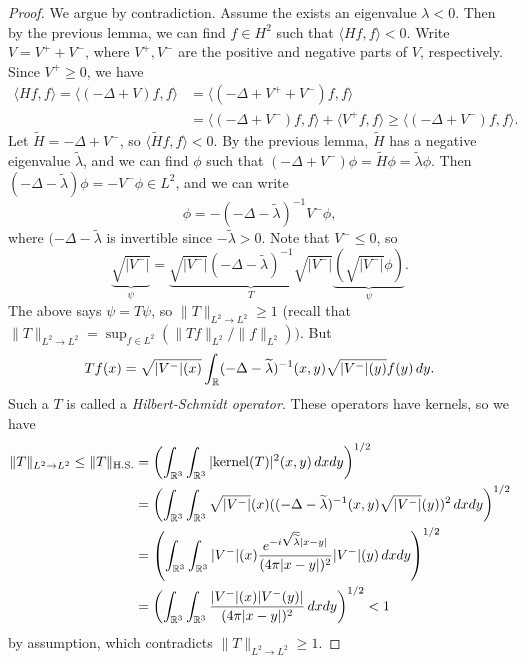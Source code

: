 \begin{proof}
  We argue by contradiction. Assume the exists an
  eigenvalue $\lambda < 0$. Then by the previous lemma,
  we can find $f \in H^2$ such that
  $\langle Hf, f \rangle < 0$. Write
  $V = V^+ + V^-$,
  where $V^+, V^-$ are the positive and negative parts
  of $V$, respectively. Since $V^+ \ge 0$, we have
  \begin{align*}
    \langle Hf, f \rangle
    = \langle (-\Delta + V) f, f \rangle
    &= \langle (-\Delta + V^+ + V^-) f, f \rangle \\
    &= \langle (-\Delta + V^-) f, f \rangle + \langle V^+ f, f \rangle
    \ge \langle (-\Delta + V^-) f, f \rangle.
  \end{align*}
  Let $\widetilde{H} = -\Delta + V^-$, so
  $\langle \widetilde{H} f, f \rangle < 0$.
  By the previous lemma, $\widetilde{H}$ has a
  negative eigenvalue $\widetilde{\lambda}$, and
  we can find $\phi$ such that
  $(-\Delta + V^-) \phi
    = \widetilde{H} \phi = \widetilde{\lambda} \phi$.
    Then $(-\Delta - \widetilde{\lambda}) \phi = -V^- \phi \in L^2$, and we can write
    \[
      \phi = -(-\Delta - \widetilde{\lambda})^{-1} V^- \phi,
    \]
    where $(-\Delta - \widetilde{\lambda}$ is invertible
    since $-\widetilde{\lambda} > 0$. Note that
    $V^- \le 0$, so
    \[
      \underbrace{\sqrt{|V^-|}}_{\psi} = \underbrace{\sqrt{|V^-|} (-\Delta - \widetilde{\lambda})^{-1}\sqrt{|V^-|}}_T \underbrace{(\sqrt{|V^-|}\phi)}_{\psi}.
    \]
    The above says $\psi = T \psi$, so
    $\|T\|_{L^2 \to L^2} \ge 1$ (recall that
    $\|T\|_{L^2 \to L^2} = \sup_{f \in L^2} (\|Tf\|_{L^2} / \|f\|_{L^2}))$.
    But
    \[
      Tf(x)
      = \sqrt{|V^{-}|(x)} \int_{\mathbb{R}} (-\Delta - \widetilde{\lambda})^{-1}(x, y) \sqrt{|V^{-}|(y)} f(y) \,dy.
    \]
    Such a $T$ is called a \emph{Hilbert-Schmidt operator}.
    These operators have kernels, so we have
    \begin{align*}
      \|T\|_{L^2 \to L^2}
      \le \|T\|_{\mathrm{H.S.}}
      &= \left(\int_{\mathbb{R}^3} \int_{\mathbb{R}^3} |\mathrm{kernel}(T)|^2(x, y)\, dxdy\right)^{1 / 2} \\
      &= \left(\int_{\mathbb{R}^3} \int_{\mathbb{R}^3} \sqrt{|V^{-}|}(x) ((-\Delta - \widetilde{\lambda})^{-1}(x, y) \sqrt{|V^-|}(y))^2\, dxdy\right)^{1 / 2} \\
      &= \left(\int_{\mathbb{R}^3} \int_{\mathbb{R}^3} |V^{-}|(x) \frac{e^{-i\sqrt{\widetilde{\lambda}}|x - y|}}{(4\pi|x - y|)^2} |V^-|(y) \, dxdy\right)^{1 / 2} \\
      &= \left(\int_{\mathbb{R}^3} \int_{\mathbb{R}^3} \frac{|V^-|(x) |V^-(y)|}{(4\pi |x - y|)^2} \, dxdy\right)^{1 / 2}
      < 1
    \end{align*}
    by assumption, which contradicts
    $\|T\|_{L^2 \to L^2} \ge 1$.
\end{proof}

